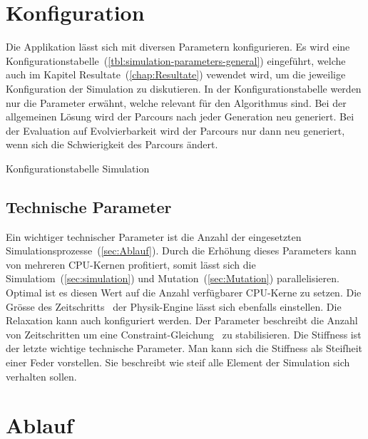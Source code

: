   \section{Konfiguration\label{sec:Konfiguration}}

    Die Applikation lässt sich mit diversen Parametern konfigurieren.
    Es wird eine Konfigurationstabelle~(\vref{tbl:simulation-parameters-general}) eingeführt,
    welche auch im Kapitel Resultate~(\vref{chap:Resultate}) vewendet wird,
    um die jeweilige Konfiguration der Simulation zu diskutieren. In der Konfigurationstabelle werden nur die Parameter erwähnt,
    welche relevant für den Algorithmus sind. Bei der allgemeinen Lösung wird der Parcours
    nach jeder Generation neu generiert. Bei der Evaluation auf Evolvierbarkeit
    wird der Parcours nur dann neu generiert, wenn sich die Schwierigkeit des Parcours ändert.

    \begin{table}[H]
      
      \caption{Konfigurationstabelle Simulation\label{tbl:simulation-parameters-general}}
    \end{table}

    \subsection{Technische Parameter}
      Ein wichtiger technischer Parameter ist die Anzahl der eingesetzten Simulationsprozesse~(\vref{sec:Ablauf}).
      Durch die Erhöhung dieses Parameters kann von mehreren CPU-Kernen profitiert, somit lässt sich die Simulatiom~(\vref{sec:simulation}) und Mutation~(\vref{sec:Mutation}) parallelisieren.
      Optimal ist es diesen Wert auf die Anzahl verfügbarer CPU-Kerne zu setzen.
      Die Grösse des Zeitschritts~\cite{bullet:steppingTheWorld} der Physik-Engine lässt sich ebenfalls einstellen.
      Die Relaxation kann auch konfiguriert werden. Der Parameter beschreibt die Anzahl von Zeitschritten um eine Constraint-Gleichung~\cite{gamedev:constraints} zu stabilisieren.
      Die Stiffness ist der letzte wichtige technische Parameter. Man kann sich die Stiffness als Steifheit einer Feder vorstellen.
      Sie beschreibt wie steif alle Element der Simulation sich verhalten sollen.


  \section{Ablauf\label{sec:Ablauf}}

